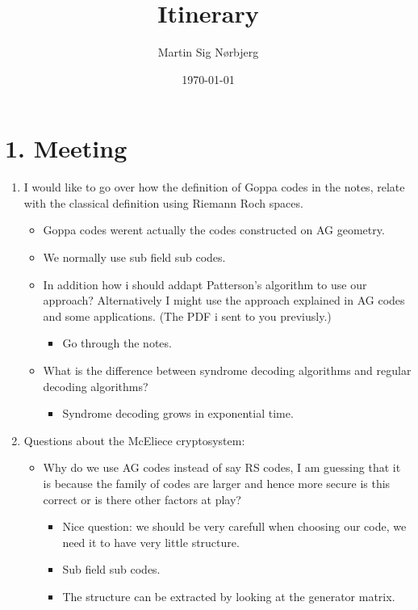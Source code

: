\documentclass[11pt]{article}
\author{Martin Sig Nørbjerg}
\date{\today}
\title{Itinerary}
\begin{document}
\maketitle

\newpage
\section{1. Meeting}
\begin{enumerate}
\item I would like to go over how the definition of Goppa codes in the notes, relate with the classical definition using Riemann Roch spaces.
\begin{itemize}
\item Goppa codes  werent actually the codes constructed on AG geometry.
\item We normally use sub field sub codes.
\item In addition how i should addapt Patterson's algorithm to use our approach? Alternatively I might use the approach explained in AG codes and some applications. (The PDF i sent to you previusly.)
\begin{itemize}
\item Go through the notes.
\end{itemize}
\item What is the difference between syndrome decoding algorithms and regular decoding algorithms?
\begin{itemize}
\item Syndrome decoding grows in exponential time.
\end{itemize}
\end{itemize}

\item Questions about the McEliece cryptosystem:
\begin{itemize}
\item Why do we use AG codes instead of say RS codes, I am guessing that it is because the family of codes are larger and hence more secure is this correct or is there other factors at play?
\begin{itemize}
\item Nice question: we should be very carefull when choosing our code, we need it to have very little structure.
\item Sub field sub codes.
\item The structure can be extracted by looking at the generator matrix.
\end{itemize}


\end{itemize}
\end{enumerate}
\end{document}
